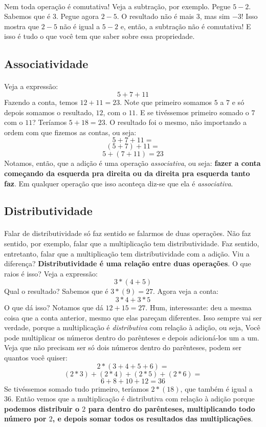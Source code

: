 \documentclass{article}
\begin{document}
\paragraph{}
Nem toda operação é comutativa! Veja a 
subtração, por exemplo. Pegue $5 - 2$. Sabemos que é $3$. Pegue agora $2 - 5$.
O resultado não é mais $3$, mas sim $-3$! Isso mostra que $2 - 5$ não é igual a
$5 - 2$ e, então, a subtração não é comutativa!
E isso é tudo o que você tem que saber sobre essa propriedade.

\subsection{Associatividade}
\paragraph{}
Veja a expressão:
$$5 + 7 + 11$$
Fazendo a conta, temos $12 + 11 = 23$. Note que primeiro somamos $5$ a $7$ e 
só depois somamos o resultado, $12$, com o $11$. E se tivéssemos primeiro 
somado o $7$ com o $11$? Teríamos $5 + 18 = 23$. 
O resultado foi o mesmo, não importando a ordem com que fizemos as contas, 
ou seja:
$$5 + 7 + 11 =$$
$$(5 + 7) + 11 =$$
$$5 + (7 + 11) = 23$$
Notamos, então, que a adição é uma operação \textit{associativa}, ou seja:
\textbf{fazer a conta começando da esquerda pra direita ou da direita pra 
esquerda tanto faz}. Em qualquer operação que isso aconteça diz-se que ela é
\textit{associativa}.

\subsection{Distributividade}
\paragraph{}
Falar de distributividade só faz sentido se falarmos de duas operações. 
Não faz sentido, por exemplo, falar que a multiplicação tem distributividade.
Faz sentido, entretanto, falar que a multiplicação tem distributividade com
a adição. Viu a diferença? \textbf{Distributividade é uma relação entre duas
operações}.
O que raios é isso? Veja a expressão:
$$3*(4 + 5)$$
Qual o resultado? Sabemos que é $3*(9) = 27$. Agora veja a conta:
$$3*4 + 3*5$$
O que dá isso? Notamos que dá $12 + 15 = 27$. Hum, interessante: deu a mesma
coisa que a conta anterior, mesmo que elas pareçam diferentes. Isso sempre vai
ser verdade, porque a multiplicação é \textit{distributiva} com relação à 
adição, ou seja, Você pode multiplicar os números dentro do parênteses
e depois adicioná-los um a um. Veja que não precisam ser só dois números dentro
do parênteses, podem ser quantos você quiser:
$$2*(3 + 4 + 5 + 6) =$$
	$$(2*3) + (2*4) + (2*5) + (2*6)=$$
$$6 + 8 + 10 + 12 = 36$$
Se tivéssemos somado tudo primeiro, teríamos $2*(18)$, que também é igual a 
$36$. Então vemos que a multiplicação é distributiva com relação à adição porque
\textbf{podemos distribuir o $2$ para dentro do parênteses, multiplicando todo 
número por $2$, e depois somar todos os resultados das multiplicações}. 
\end{document}
